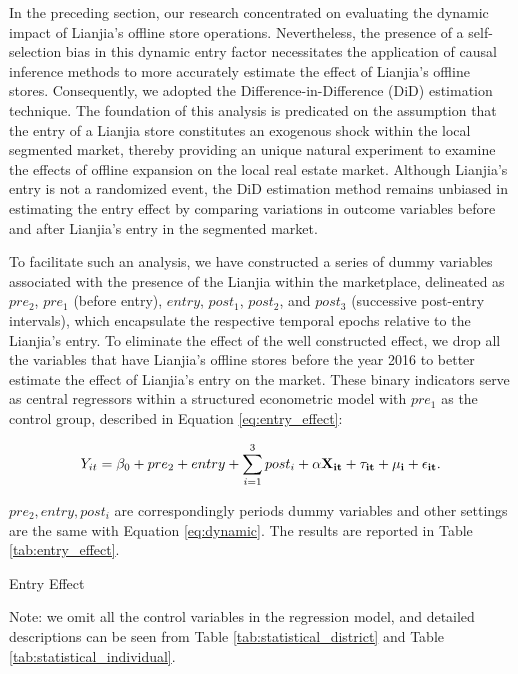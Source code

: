 \documentclass[11pt]{article}
\begin{document}
In the preceding section, our research concentrated on evaluating the dynamic impact of Lianjia's offline store operations. Nevertheless, the presence of a self-selection bias in this dynamic entry factor necessitates the application of causal inference methods to more accurately estimate the effect of Lianjia's offline stores. Consequently, we adopted the Difference-in-Difference (DiD) estimation technique. The foundation of this analysis is predicated on the assumption that the entry of a Lianjia store constitutes an exogenous shock within the local segmented market, thereby providing an unique natural experiment to examine the effects of offline expansion on the local real estate market. Although Lianjia's entry is not a randomized event, the DiD estimation method remains unbiased in estimating the entry effect by comparing variations in outcome variables before and after Lianjia's entry in the segmented market.

To facilitate such an analysis, we have constructed a series of dummy variables associated with the presence of the Lianjia within the marketplace, delineated as $pre_2$, $pre_1$ (before entry), $entry$, $post_1$, $post_2$, and $post_3$ (successive post-entry intervals), which encapsulate the respective temporal epochs relative to the Lianjia's entry. To eliminate the effect of the well constructed effect, we drop all the variables that have Lianjia's offline stores before the year 2016 to better estimate the effect of Lianjia's entry on the market. These binary indicators serve as central regressors within a structured econometric model with $pre_1$ as the control group, described in Equation \eqref{eq:entry_effect}:

\begin{equation}
    Y_{it} = \beta_0 +  pre_2 + entry + \sum_{i=1}^3 post_i + \bf{\alpha} \bf{X}_{it} + \tau_{it} + \mu_i + \epsilon_{it}.   \label{eq:entry_effect}
\end{equation}

$pre_2, entry, post_i$ are correspondingly periods dummy variables and other settings are the same with Equation \eqref{eq:dynamic}. The results are reported in Table \ref{tab:entry_effect}.

\begin{table}[htb!]
  \begin{center}
    \begin{scriptsize}
    \caption{Entry Effect}
    \label{tab:entry_effect}
      
    
    Note: we omit all the control variables in the regression model, and detailed descriptions can be seen from Table \ref{tab:statistical_district} and Table \ref{tab:statistical_individual}.
    \end{scriptsize}
  \end{center}
\end{table}
\end{document}
